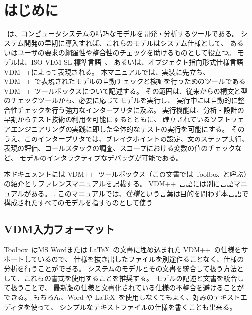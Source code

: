 \documentclass[\pformat,12pt]{jarticle}
\newcommand{\vdmslpp}{VDM++}
\newcommand{\Toolbox}{Toolbox}
\begin{document}
\vdmtoolsmanualscsk{VDMTools ユーザマニュアル (\vdmslpp)}
       {}

\section{はじめに} \label{introduction}



\VDMTools\ は、コンピュータシステムの精巧なモデルを開発・分析するツールである。
システム開発の早期に導入すれば、これらのモデルはシステム仕様として、
あるいはユーザの要求の網羅性や整合性のチェックを助けるものとして役立つ。
モデルは、ISO VDM-SL 標準言語~\cite{ISOVDM96}、
あるいは、オブジェクト指向形式仕様言語VDM++\cite{LangManPP-SCSK}\cite{Fitzgerald&05}によって表現される。
本マニュアルでは、実装に先立ち、 \vdmslpp\ で表現されたモデルの自動チェックと検証を行うためのツールである
 \vdmslpp\ ツールボックスについて記述する。
その範囲は、従来からの構文と型のチェックツールから、必要に応じてモデルを実行し、
実行中には自動的に整合性チェックを行う強力なインタープリタに及ぶ。
実行機能は、分析・設計の早期からテスト技術の利用を可能にするとともに、
確立されているソフトウェアエンジニアリングの実践に即した全体的なテストの実行を可能にする。
そのうえ、このインタープリタでは、ブレイクポイントの設定、文のステップ実行、
表現の評価、コールスタックの調査、スコープにおける変数の値のチェックなど、
モデルのインタラクティブなデバッグが可能である。

本ドキュメントには \vdmslpp\ ツールボックス（この文書では \Toolbox\ と呼ぶ）の紹介とリファレンスマニュアルを記載する。
\vdmslpp\ 言語には別に言語マニュアルがある。
.
このマニュアルでは、{\em 仕様\/}という言葉は目的を問わず本言語で構成されたすべてのモデルを指すものとして使う

\subsection*{VDM入力フォーマット}


\Toolbox\ はMS Wordまたは \LaTeX\ の文書に埋め込まれた \vdmslpp\ の仕様をサポートしているので、
仕様を抜き出したファイルを別途作ることなく、仕様の分析を行うことができる。
システムのモデルとその文書を統合して扱う方法として、これらの書式を使用することを推奨する。
モデルの記述と文書を統合して扱うことで、
最新版の仕様と文書化されている仕様の不整合を避けることができる。
もちろん、Word や \LaTeX\ を使用しなくてもよく、好みのテキストエディタを使って、
シンプルなテキストファイルの仕様を書くことも出来る。
\end{document}
